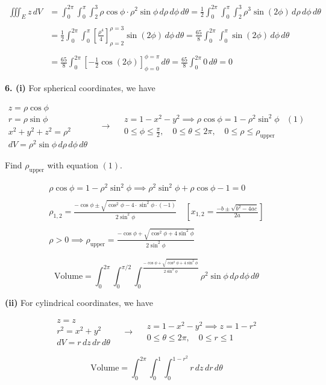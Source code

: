 \documentclass{article}
\begin{document}
\begin{align*}
\iiint_Ez\,dV&=\int_0^{2\pi}\int_0^\pi\int_2^3\rho\cos\phi\cdot\rho^2\sin\phi\,d\rho\,d\phi\,d\theta=\frac12\int_0^{2\pi}\int_0^\pi\int_2^3\rho^3\sin(2\phi)\,d\rho\,d\phi\,d\theta\\\\&=\frac12\int_0^{2\pi}\int_0^\pi\left[\frac{\rho^4}{4}\right]_{\rho=2}^{\rho=3}\sin(2\phi)\,d\phi\,d\theta=\frac{65}{8}\int_0^{2\pi}\int_0^\pi\sin(2\phi)\,d\phi\,d\theta\\\\&=\frac{65}{8}\int_0^{2\pi}\left[-\frac12\cos(2\phi)\right]_{\phi=0}^{\phi=\pi}\,d\theta=\frac{65}{8}\int_0^{2\pi}0\,d\theta =\boxed0
\end{align*}

\newpage

\textbf{6. (i)} For spherical coordinates, we have

\[
\begin{array}{c}
z=\rho\cos\phi\\
r=\rho\sin\phi\\
x^2+y^2+z^2=\rho^2\\
dV=\rho^2\sin\phi\,d\rho\,d\phi\,d\theta
\end{array}\quad\rightarrow\quad
\begin{array}{cc}
z=1-x^2-y^2\implies\rho\cos\phi=1-\rho^2\sin^2\phi&(1)\\[0.3cm]
\displaystyle0\leq\phi\leq\frac\pi2,\quad0\leq\theta\leq2\pi,\quad0\leq\rho\leq\rho_{\text{upper}}
\end{array}
\]

Find $\rho_{\text{upper}}$ with equation $(1)$.

\[
\begin{array}{c}
\rho\cos\phi=1-\rho^2\sin^2\phi\implies \rho^2\sin^2\phi+\rho\cos\phi-1=0\\\\
\displaystyle \rho_{1,2} = \frac{-\cos\phi \pm\sqrt{\cos^2\phi-4\cdot\sin^2\phi\cdot(-1)}}{2\sin^2\phi}\quad\left[x_{1,2}=\frac{-b\pm\sqrt{b^2-4ac}}{2a}\right]\\\\
\displaystyle \rho>0\implies\rho_{\text{upper}}=\frac{-\cos\phi +\sqrt{\cos^2\phi+4\sin^2\phi}}{2\sin^2\phi}
\end{array}
\]

\[\boxed{\text{Volume}=\int_0^{2\pi}\int_0^{\pi/2}\int_0^{\textstyle\frac{-\cos\phi +\sqrt{\cos^2\phi+4\sin^2\phi}}{2\sin^2\phi}}\rho^2\sin\phi\,d\rho\,d\phi\,d\theta}\]

\textbf{(ii)} For cylindrical coordinates, we have

\[
\begin{array}{c}
z=z\\
r^2=x^2+y^2\\
dV=r\,dz\,dr\,d\theta
\end{array}\quad\rightarrow\quad
\begin{array}{c}
z=1-x^2-y^2\implies z=1-r^2\\
0\leq\theta\leq2\pi,\quad 0\leq r \leq1
\end{array}
\]

\[\boxed{\text{Volume}=\int_0^{2\pi}\int_0^1\int_0^{1-r^2}r\,dz\,dr\,d\theta}\]
\end{document}
